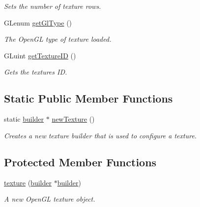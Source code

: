 \begin{DoxyCompactItemize}
\begin{DoxyCompactList}\small\item\em Sets the number of texture rows. \end{DoxyCompactList}\item 
G\+Lenum \hyperlink{classflounder_1_1texture_a7405133ba0da2f3a48d32a63535594fa}{get\+Gl\+Type} ()
\begin{DoxyCompactList}\small\item\em The Open\+GL type of texture loaded. \end{DoxyCompactList}\item 
G\+Luint \hyperlink{classflounder_1_1texture_a0259b718bf84710c21f1ebf823771ca4}{get\+Texture\+ID} ()
\begin{DoxyCompactList}\small\item\em Gets the textures ID. \end{DoxyCompactList}\end{DoxyCompactItemize}
\subsection*{Static Public Member Functions}
\begin{DoxyCompactItemize}
\item 
static \hyperlink{classflounder_1_1texture_1_1builder}{builder} $\ast$ \hyperlink{classflounder_1_1texture_af6311afbba328755cd0ff6a7839e9172}{new\+Texture} ()
\begin{DoxyCompactList}\small\item\em Creates a new texture builder that is used to configure a texture. \end{DoxyCompactList}\end{DoxyCompactItemize}
\subsection*{Protected Member Functions}
\begin{DoxyCompactItemize}
\item 
\hyperlink{classflounder_1_1texture_a82dd2e895abe671411ab0fcaaf49b5d1}{texture} (\hyperlink{classflounder_1_1texture_1_1builder}{builder} $\ast$\hyperlink{classflounder_1_1texture_1_1builder}{builder})
\begin{DoxyCompactList}\small\item\em A new Open\+GL texture object. \end{DoxyCompactList}\end{DoxyCompactItemize}
